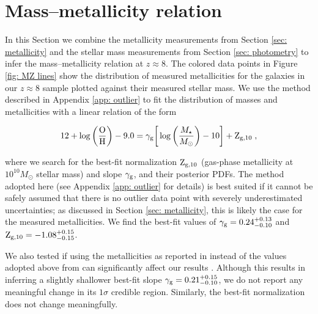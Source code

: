 \documentclass[twocolumn]{aastex631}
\begin{document}
\section{Mass--metallicity relation} \label{sec: MZ}

In this Section we combine the metallicity measurements from Section \ref{sec: metallicity} and the stellar mass measurements from Section \ref{sec: photometry} to infer the mass--metallicity relation at $z \approx 8$. The colored data points in Figure \ref{fig: MZ lines} show the distribution of measured metallicities for the galaxies in our $z \approx 8$ sample plotted against their measured stellar mass. We use the method described in Appendix \ref{app: outlier} to fit the distribution of masses and metallicities with a linear relation of the form \citep[adopted from][]{ma+2016}

\begin{equation}
    12 + \log\left (\frac{\textnormal{O}}{\textnormal{H}}\right) - 9.0 = \gamma_{\textnormal{\scriptsize g}}\bigg[\log\left(\frac{M_{\star}}{M_{\odot}}\right) - 10\bigg] + \textnormal{Z}_{\textnormal{\scriptsize g,10}}\;,
\label{eq: forward}
\end{equation}

\noindent
where we search for the best-fit normalization $\textnormal{Z}_{\textnormal{\scriptsize g,10}}$ (gas-phase metallicity at $10^{10} M_{\odot}$ stellar mass) and slope $\gamma_{\textnormal{\scriptsize g}}$, and their posterior PDFs. The method adopted here (see Appendix \ref{app: outlier} for details) is best suited if it cannot be safely assumed that there is no outlier data point with severely underestimated uncertainties; as discussed in Section \ref{sec: metallicity}, this is likely the case for the measured metallicities. We find the best-fit values of $\gamma_{\textnormal{\scriptsize g}} = 0.24^{+0.13}_{-0.10}$ and $\textnormal{Z}_{\textnormal{\scriptsize g,10}} = -1.08^{+0.15}_{-0.15}$. 


We also tested if using the metallicities as reported in \cite{schaerer+2022} instead of the values adopted above from \cite{curti+2022} can significantly affect our results \citep[see][for a discussion of the different determinations of the metallicities of the three SMACS galaxies]{2022ApJ...939L...3T}. Although this results in inferring a slightly shallower best-fit slope $\gamma_{\textnormal{\scriptsize g}} = 0.21^{+0.15}_{-0.10}$, we do not report any meaningful change in its $1\sigma$ credible region. Similarly, the best-fit normalization does not change meaningfully.  
\end{document}
